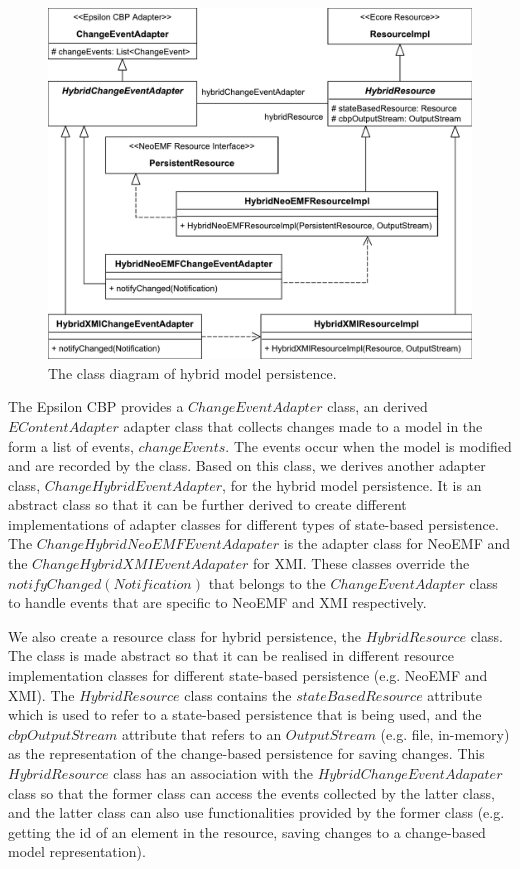 \documentclass[10pt,conference]{IEEEtran}
\begin{document}
\begin{figure}[ht]
    \includegraphics[width=\linewidth]{images/class_diagram}
    \caption{The class diagram of hybrid model persistence.}
    \label{fig:class_diagram}
\end{figure}

The Epsilon CBP provides a $ChangeEventAdapter$ class, an derived $EContentAdapter$ adapter class that collects changes made to a model in the form a list of events, $changeEvents$. The events occur when the model is modified and are recorded by the class. Based on this class, we derives another adapter class, $ChangeHybridEventAdapter$, for the hybrid model persistence. It is an abstract class so that it can be further derived to create different implementations of adapter classes for different types of state-based persistence. The $ChangeHybridNeoEMFEventAdapater$ is the adapter class for NeoEMF and the $ChangeHybridXMIEventAdapater$ for XMI. These classes override the $notifyChanged(Notification)$ that belongs to the $ChangeEventAdapter$ class to handle events that are specific to NeoEMF and XMI respectively. 

We also create a resource class for hybrid persistence, the $HybridResource$ class. The class is made abstract so that it can be realised in different resource implementation classes for different state-based persistence (e.g. NeoEMF and XMI). The $HybridResource$ class contains the $stateBasedResource$ attribute which is used to refer to a state-based persistence that is being used, and the $cbpOutputStream$ attribute that refers to an $OutputStream$ (e.g. file, in-memory) as the representation of the change-based persistence for saving changes. This $HybridResource$ class has an association with the $HybridChangeEventAdapater$ class so that the former class can access the events collected by the latter class, and the latter class can also use functionalities provided by the former class (e.g. getting the id of an element in the resource, saving changes to a change-based model representation).
\end{document}
